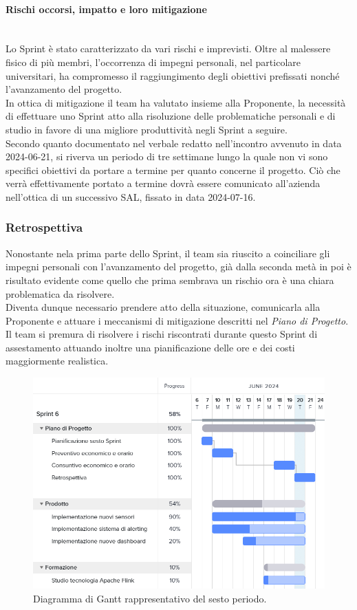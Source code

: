 \documentclass[8pt]{article}
\newcommand{\subsubsubsection}[1]{\paragraph{#1}\mbox{}\\}
\begin{document}
\subsubsubsection{Rischi occorsi, impatto e loro mitigazione}
Lo Sprint è stato caratterizzato da vari rischi e imprevisti. Oltre al malessere fisico di più membri, l'occorrenza di impegni personali, nel particolare universitari, ha compromesso il raggiungimento degli obiettivi prefissati nonché l'avanzamento del progetto.\\
In ottica di mitigazione il team ha valutato insieme alla Proponente, la necessità di effettuare uno Sprint atto alla risoluzione delle problematiche personali e di studio in favore di una migliore produttività negli Sprint a seguire.\\
Secondo quanto documentato nel verbale redatto nell'incontro avvenuto in data 2024-06-21, si riverva un periodo di tre settimane lungo la quale non vi sono specifici obiettivi da portare a termine per quanto concerne il progetto. 
Ciò che verrà effettivamente portato a termine dovrà essere comunicato all'azienda nell'ottica di un successivo SAL, fissato in data 2024-07-16.

\subsubsection{Retrospettiva}

Nonostante nela prima parte dello Sprint, il team sia riuscito a coinciliare gli impegni personali con l'avanzamento del progetto, già dalla seconda metà in poi è risultato evidente come quello che prima sembrava un rischio ora è una chiara problematica da risolvere.\\
Diventa dunque necessario prendere atto della situazione, comunicarla alla Proponente e attuare i meccanismi di mitigazione descritti nel \textit{Piano di Progetto}. 
Il team si premura di risolvere i rischi riscontrati durante questo Sprint di assestamento attuando inoltre una pianificazione delle ore e dei costi maggiormente realistica.

\begin{figure}[h!]
    \centering
    \includegraphics[width=13cm]{./images_pdp/gantt6.png}
    \caption{Diagramma di Gantt rappresentativo del sesto periodo.}
\end{figure}
\clearpage
\end{document}
